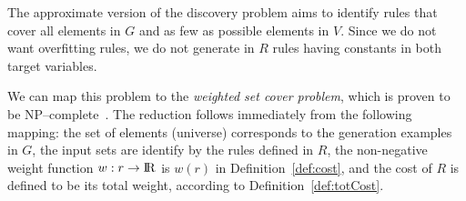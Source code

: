 The approximate version of the discovery problem aims to identify rules that cover all elements in $G$ and as few as possible elements in $V$. Since we do not want overfitting rules, we do not generate in $R$ rules having constants in both target variables.

We can map this problem to the {\em weighted set cover problem}, which is proven to be NP--complete~\cite{chvatal1979greedy}. The reduction follows immediately from the following mapping: 
the set of elements (universe) corresponds to the generation examples in $G$, the input sets are identify by the rules defined in $R$, the non-negative weight
function $w: r \rightarrow {\rm I\!R}$ is $w(r)$ in Definition~\ref{def:cost}, and the cost of $R$ is defined to be its total weight, according to Definition~\ref{def:totCost}. %



